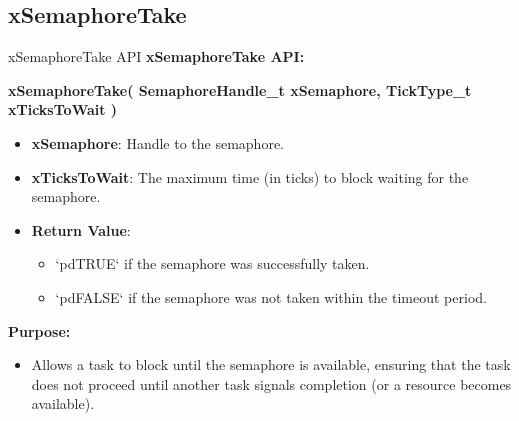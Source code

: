 \documentclass[10pt]{beamer}
\begin{document}
\subsection{xSemaphoreTake}
\begin{frame}{xSemaphoreTake API}
    \textbf{xSemaphoreTake API:}
    
    \vspace{0.2cm}
    \textbf{xSemaphoreTake( SemaphoreHandle\_t xSemaphore, TickType\_t xTicksToWait )}
    
    \begin{itemize}
        \item \textbf{xSemaphore}: Handle to the semaphore.
        \item \textbf{xTicksToWait}: The maximum time (in ticks) to block waiting for the semaphore.
        \item \textbf{Return Value}: 
            \begin{itemize}
                \item `pdTRUE` if the semaphore was successfully taken.
                \item `pdFALSE` if the semaphore was not taken within the timeout period.
            \end{itemize}
    \end{itemize}
    
    \vspace{0.3cm}
    
    \textbf{Purpose:}
    \begin{itemize}
        \item Allows a task to block until the semaphore is available, ensuring that the task does not proceed until another task signals completion (or a resource becomes available).
    \end{itemize}
    
\end{frame}
\end{document}
